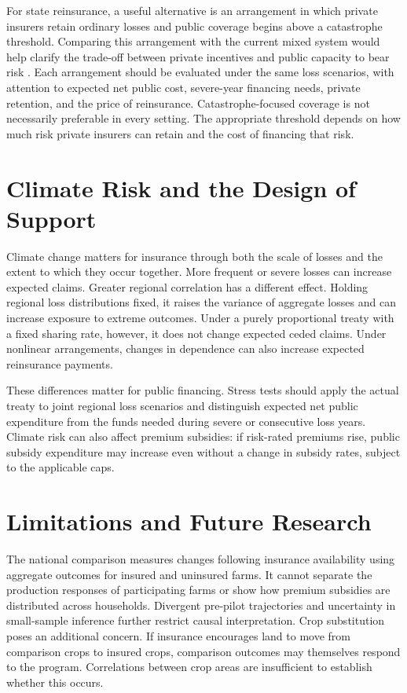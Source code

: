 For state reinsurance, a useful alternative is an arrangement in which private insurers retain ordinary losses and public coverage begins above a catastrophe threshold. Comparing this arrangement with the current mixed system would help clarify the trade-off between private incentives and public capacity to bear risk \citep{mahul2010,jia2025}. Each arrangement should be evaluated under the same loss scenarios, with attention to expected net public cost, severe-year financing needs, private retention, and the price of reinsurance. Catastrophe-focused coverage is not necessarily preferable in every setting. The appropriate threshold depends on how much risk private insurers can retain and the cost of financing that risk.

\section{Climate Risk and the Design of Support}\label{sec:climate}

Climate change matters for insurance through both the scale of losses and the extent to which they occur together. More frequent or severe losses can increase expected claims. Greater regional correlation has a different effect. Holding regional loss distributions fixed, it raises the variance of aggregate losses and can increase exposure to extreme outcomes. Under a purely proportional treaty with a fixed sharing rate, however, it does not change expected ceded claims. Under nonlinear arrangements, changes in dependence can also increase expected reinsurance payments.

These differences matter for public financing. Stress tests should apply the actual treaty to joint regional loss scenarios and distinguish expected net public expenditure from the funds needed during severe or consecutive loss years. Climate risk can also affect premium subsidies: if risk-rated premiums rise, public subsidy expenditure may increase even without a change in subsidy rates, subject to the applicable caps.

\section{Limitations and Future Research}\label{sec:limitations}

The national comparison measures changes following insurance availability using aggregate outcomes for insured and uninsured farms. It cannot separate the production responses of participating farms or show how premium subsidies are distributed across households. Divergent pre-pilot trajectories and uncertainty in small-sample inference further restrict causal interpretation. Crop substitution poses an additional concern. If insurance encourages land to move from comparison crops to insured crops, comparison outcomes may themselves respond to the program. Correlations between crop areas are insufficient to establish whether this occurs.

